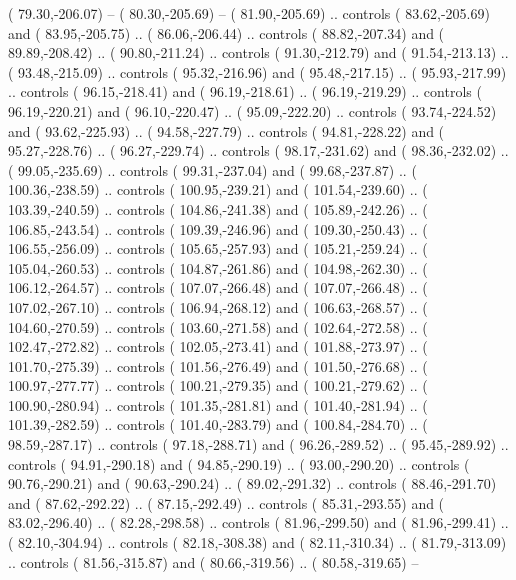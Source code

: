 {        (  79.30,-206.07) -- 
        (  80.30,-205.69) -- 
        (  81.90,-205.69) .. controls (  83.62,-205.69) and (  83.95,-205.75) ..
        (  86.06,-206.44) .. controls (  88.82,-207.34) and (  89.89,-208.42) ..
        (  90.80,-211.24) .. controls (  91.30,-212.79) and (  91.54,-213.13) ..
        (  93.48,-215.09) .. controls (  95.32,-216.96) and (  95.48,-217.15) ..
        (  95.93,-217.99) .. controls (  96.15,-218.41) and (  96.19,-218.61) ..
        (  96.19,-219.29) .. controls (  96.19,-220.21) and (  96.10,-220.47) ..
        (  95.09,-222.20) .. controls (  93.74,-224.52) and (  93.62,-225.93) ..
        (  94.58,-227.79) .. controls (  94.81,-228.22) and (  95.27,-228.76) ..
        (  96.27,-229.74) .. controls (  98.17,-231.62) and (  98.36,-232.02) ..
        (  99.05,-235.69) .. controls (  99.31,-237.04) and (  99.68,-237.87) ..
        ( 100.36,-238.59) .. controls ( 100.95,-239.21) and ( 101.54,-239.60) ..
        ( 103.39,-240.59) .. controls ( 104.86,-241.38) and ( 105.89,-242.26) ..
        ( 106.85,-243.54) .. controls ( 109.39,-246.96) and ( 109.30,-250.43) ..
        ( 106.55,-256.09) .. controls ( 105.65,-257.93) and ( 105.21,-259.24) ..
        ( 105.04,-260.53) .. controls ( 104.87,-261.86) and ( 104.98,-262.30) ..
        ( 106.12,-264.57) .. controls ( 107.07,-266.48) and ( 107.07,-266.48) ..
        ( 107.02,-267.10) .. controls ( 106.94,-268.12) and ( 106.63,-268.57) ..
        ( 104.60,-270.59) .. controls ( 103.60,-271.58) and ( 102.64,-272.58) ..
        ( 102.47,-272.82) .. controls ( 102.05,-273.41) and ( 101.88,-273.97) ..
        ( 101.70,-275.39) .. controls ( 101.56,-276.49) and ( 101.50,-276.68) ..
        ( 100.97,-277.77) .. controls ( 100.21,-279.35) and ( 100.21,-279.62) ..
        ( 100.90,-280.94) .. controls ( 101.35,-281.81) and ( 101.40,-281.94) ..
        ( 101.39,-282.59) .. controls ( 101.40,-283.79) and ( 100.84,-284.70) ..
        (  98.59,-287.17) .. controls (  97.18,-288.71) and (  96.26,-289.52) ..
        (  95.45,-289.92) .. controls (  94.91,-290.18) and (  94.85,-290.19) ..
        (  93.00,-290.20) .. controls (  90.76,-290.21) and (  90.63,-290.24) ..
        (  89.02,-291.32) .. controls (  88.46,-291.70) and (  87.62,-292.22) ..
        (  87.15,-292.49) .. controls (  85.31,-293.55) and (  83.02,-296.40) ..
        (  82.28,-298.58) .. controls (  81.96,-299.50) and (  81.96,-299.41) ..
        (  82.10,-304.94) .. controls (  82.18,-308.38) and (  82.11,-310.34) ..
        (  81.79,-313.09) .. controls (  81.56,-315.87) and (  80.66,-319.56) ..
        (  80.58,-319.65) -- 
}
